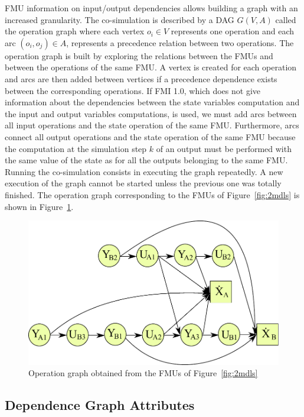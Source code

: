 FMU information on input/output dependencies allows building a graph with an increased granularity. The co-simulation is described by a DAG $G(V,A)$ called the operation graph where each vertex $o_i \in V$ represents one operation and each arc $(o_i,o_j) \in A$, represents a precedence relation between two operations. The operation graph is built by exploring the relations between the FMUs and between the operations of the same FMU. A vertex is created for each operation and arcs are then added between vertices if a precedence dependence exists between the corresponding operations. If FMI 1.0, which does not give information about the dependencies between the state variables computation and the input and output variables computations, is used, we must add arcs between all input operations and the state operation of the same FMU. Furthermore, arcs connect all output operations and the state operation of the same FMU because the computation at the simulation step $k$ of an output must be performed with the same value of the state as for all the outputs belonging to the same FMU. Running the co-simulation consists in executing the graph repeatedly. A new execution of the graph cannot be started unless the previous one was totally finished. The operation graph corresponding to the FMUs of Figure~\ref{fig:2mdls} is shown in Figure~\ref{fig:dag}.

\begin{figure}[htb]
\centering
  \includegraphics[scale=0.5]{figures/Operation_Graph_Two_Models}
\caption{Operation graph obtained from the FMUs of Figure~\ref{fig:2mdls}}
\label{fig:dag}
\end{figure} 

\subsection{Dependence Graph Attributes}

